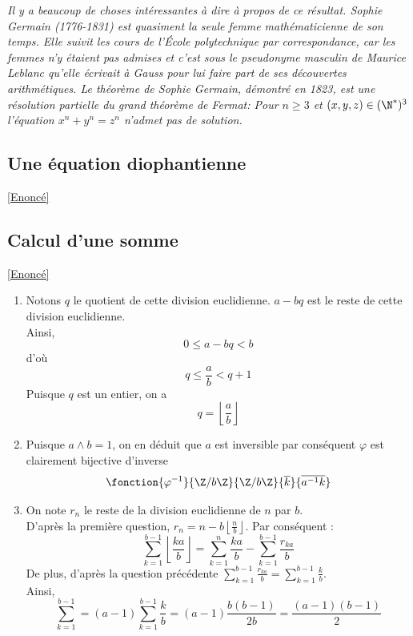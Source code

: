 \documentclass[8pt]{book}
\begin{document}
	\textit{Il y a beaucoup de choses intéressantes à dire à propos de ce résultat. Sophie Germain (1776-1831) est quasiment la seule femme mathématicienne de son temps. Elle suivit les cours de l’École polytechnique par correspondance, car les femmes n’y étaient pas admises et c’est sous le pseudonyme masculin de Maurice Leblanc qu’elle écrivait à Gauss pour lui faire part de ses découvertes arithmétiques. Le théorème de Sophie Germain, démontré en 1823, est une résolution partielle du grand théorème de Fermat: Pour $n\geq 3$ et $(x,y,z)\in (\N^*)^3$ l'équation $x^n+y^n=z^n$ n'admet pas de solution.}
	
	\subsection{Une équation diophantienne}
	\label{Une équation diophantienne corrigé}
	\textcolor{blue}{\hyperref[Une équation diophantienne]{[Enoncé]}}\\
	
	\subsection{Calcul d'une somme}
	\label{Calcul d'une somme corrigé}
	\textcolor{blue}{\hyperref[Calcul d'une somme]{[Enoncé]}}\\
	\begin{enumerate}[leftmargin=*]
		\item Notons $q$ le quotient de cette division euclidienne. $a-bq$ est le reste de cette division euclidienne.\\
		Ainsi, \[0\leq a-bq < b\]
		d'où \[q\leq \frac{a}{b}<q+1\]
		Puisque $q$ est un entier, on a \[q=\left\lfloor \frac{a}{b}\right\rfloor\]
		\item Puisque $a\wedge b=1$, on en déduit que $a$ est inversible par conséquent $\varphi$ est clairement bijective d'inverse \[\fonction{\varphi^{-1}}{\Z/b\Z}{\Z/b\Z}{\overline{k}}{\overline{a^{-1}k}}\]
		\item On note $r_n$ le reste de la division euclidienne de $n$ par $b$.\\
		D'après la première question, $r_n=n-b\left\lfloor\frac{n}{b}\right\rfloor$. Par conséquent : 
		\[\sum_{k=1}^{b-1}\left\lfloor\frac{ka}{b}\right\rfloor=\sum_{k=1}^{n}\frac{ka}{b}-\sum_{k=1}^{b-1}\frac{r_{ka}}{b}\]
		De plus, d'après la question précédente $\sum_{k=1}^{b-1}\frac{r_{ka}}{b}=\sum_{k=1}^{b-1}\frac{k}{b}$.\\
		Ainsi, \[\sum_{k=1}^{b-1}=(a-1)\sum_{k=1}^{b-1}\frac{k}{b}=(a-1)\frac{b(b-1)}{2b}=\frac{(a-1)(b-1)}{2}\]
	\end{enumerate}
\end{document}
